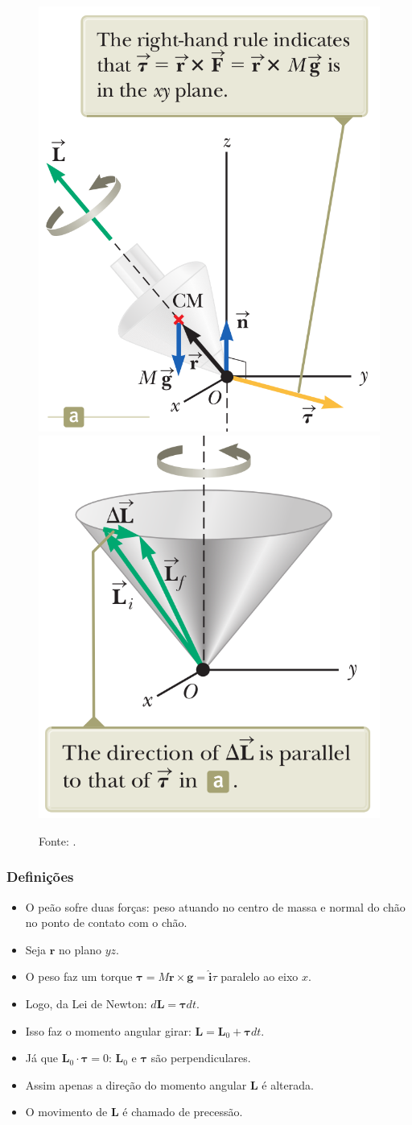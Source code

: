 \documentclass{beamer}
\begin{document}
\begin{frame}
\begin{figure}
\includegraphics[width=2.2 in]{figuras/peao1.png}
\pause
\includegraphics[width=2.2 in]{figuras/peao2.png}
\caption{Fonte: \cite{Serway2014}.}
\end{figure}
\end{frame}



\begin{frame}
\frametitle{Definições}
\begin{itemize}
\item O peão sofre duas forças: peso atuando no centro de massa e normal do chão no ponto de contato com o chão.
\item Seja {\color{red}$\textbf{r}$} no plano $yz$.
\item O peso faz um torque {\color{red}$\bm{\tau} = M\textbf{r} \times \textbf{g}=\hat{\textbf{i}}\tau$} paralelo ao eixo $x$.
\pause
\item Logo, da Lei de Newton: {\color{red}$d\textbf{L} = \bm{\tau}dt$}.
\item Isso faz o momento angular girar: {\color{red}$\textbf{L} = \textbf{L}_0 + \bm{\tau}dt$}.
\item Já que {\color{red}$\textbf{L}_0 \cdot \bm{\tau}=0$}: {\color{red}$\textbf{L}_0$} e {\color{red}$\bm{\tau}$} são perpendiculares.
\pause
\item Assim apenas a direção do momento angular {\color{red}$\textbf{L}$} é alterada.
\item O movimento de {\color{red}$\textbf{L}$} é chamado de precessão.
\end{itemize}
\end{frame}
\end{document}
